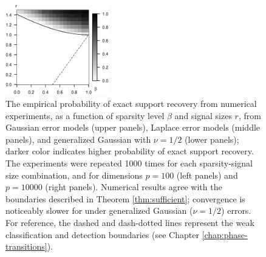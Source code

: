 \begin{figure}
      \includegraphics[width=0.4\textwidth]{./figures/simulated_boundaries/simulated_phase_diagram_NLC_p10000.eps}
      \caption{The empirical probability of exact support recovery from numerical experiments, as a function of sparsity level $\beta$ and signal sizes $r$, from Gaussian error models (upper panels), Laplace error models (middle panels), and generalized Gaussian with $\nu=1/2$ (lower panels); darker color indicates higher probability of exact support recovery. 
      The experiments were repeated 1000 times for each sparsity-signal size combination, and for dimensions $p=100$ (left panels) and $p=10000$ (right panels). Numerical results agree with the boundaries described in Theorem \ref{thm:sufficient}; convergence is noticeably slower for under generalized Gaussian ($\nu=1/2$) errors.
      For reference, the dashed and dash-dotted lines represent the weak classification and detection boundaries (see Chapter \ref{chap:phase-transitions}).}
      \label{fig:phase-simulated}
\end{figure}

